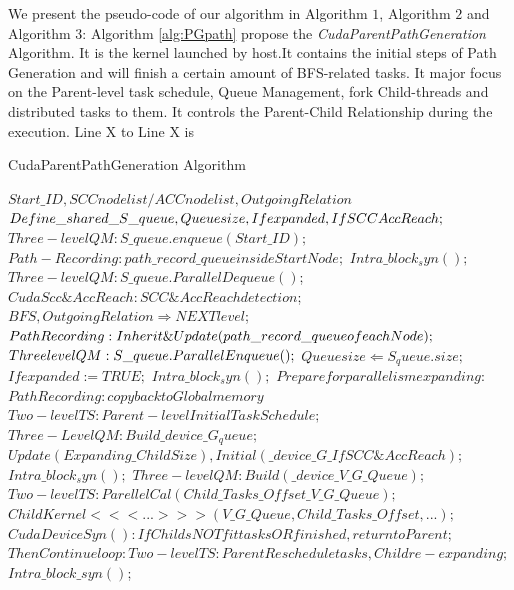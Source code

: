 \documentclass{llncs}
\begin{document}
We present the pseudo-code of our algorithm in Algorithm $1$, Algorithm $2$ and Algorithm $3$: Algorithm \ref{alg:PGpath} propose the \textsl{CudaParentPathGeneration} Algorithm. It is the kernel launched by host.It contains the initial steps of Path Generation and will finish a certain amount of BFS-related tasks. It major focus on the Parent-level task schedule, Queue Management, fork Child-threads and distributed tasks to them. It controls the Parent-Child Relationship during the execution. Line X to Line X is

			\begin{algorithm}[htbp]
			\caption{CudaParentPathGeneration Algorithm}
			\label{alg:PGpath}
			\begin{algorithmic}[1]
            \Require $Start\_ID, SCCnodelist/ACCnodelist, OutgoingRelation$
            \State $Define \_shared\_ S\_queue, Queuesize, Ifexpanded, IfSCC\/AccReach;$
                \State $Three-levelQM: S\_queue.enqueue(Start\_ID);$
                \State $Path-Recording: path\_record\_queue inside StartNode;$
            \EndIf
            \State $Intra\_block_syn();$
                    \State $Three-levelQM:S\_queue.ParallelDequeue()$;
		            \State $CudaScc\&AccReach: SCC\&AccReach detection$;
		            \State $BFS, OutgoingRelation \Rightarrow NEXT level$;
		            \State $Path\-Recording:Inherit\&Update(path\_record\_queue of each Node);$
		            \State $Three\-levelQM:S\_queue.ParallelEnqueue();$
                \EndIf
                    \State $Queuesize \Leftarrow S_queue.size;$
			             \State $Ifexpanded := TRUE;$
                    \EndIf
                \EndIf
            \EndWhile
            \State $Intra\_block_syn();$
                \State $Prepare for parallelism expanding:$
                \State $Path Recording:copy back to Global memory$
		        \State $Two-levelTS: Parent-level Initial Task Schedule;$
		        \State $Three-LevelQM: Build \_device\_ G_queue;$
                \State $Update(Expanding\_ChildSize), Initial(\_device\_ G\_IfSCC\&AccReach);$
            \EndIf
            \State $Intra\_block_syn();$
		              \State $Three-levelQM: Build(\_device\_ V\_G\_Queue);$
	                  \State $Two-levelTS: ParellelCal(Child\_Tasks\_Offset\_V\_G\_Queue);$
                \EndIf
		              \State $ChildKernel<<<...>>>(V\_G\_Queue,Child\_Tasks\_Offset,...);$
                      \State $CudaDeviceSyn():If Childs NOT fit tasks OR finished, return to Parent;$
                      \State $Then Continue loop:Two-levelTS:Parent Reschedule tasks, Child re-expanding;$
                \EndIf
	        \EndWhile
            \State $Intra\_block\_syn()$;
            \end{algorithmic}
			\end{algorithm}
\end{document}

